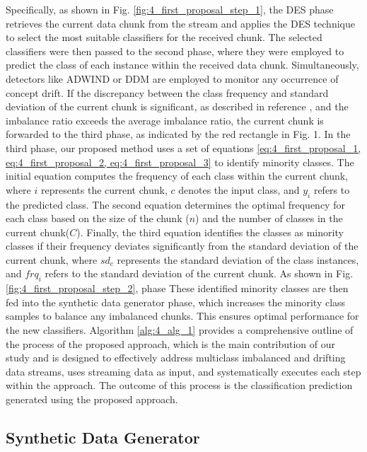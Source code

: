 Specifically, as shown in Fig. \ref{fig:4_first_proposal_step_1}, the DES phase retrieves the current data chunk from the stream and applies the DES technique to select the most suitable classifiers for the received chunk. The selected classifiers were then passed to the second phase, where they were employed to predict the class of each instance within the received data chunk. Simultaneously, detectors like ADWIND or DDM are employed to monitor any occurrence of concept drift. If the discrepancy between the class frequency and standard deviation of the current chunk is significant, as described in reference \cite{gama2004learning}, and the imbalance ratio exceeds the average imbalance ratio, the current chunk is forwarded to the third phase, as indicated by the red rectangle in Fig. 1. In the third phase, our proposed method uses a set of equations 	\ref{eq:4_first_proposal_1, eq:4_first_proposal_2, eq:4_first_proposal_3}
to identify minority classes. The initial equation computes the frequency of each class within the current chunk, where $i$ represents the current chunk, $c$ denotes the input class, and $y_i$ refers to the predicted class. The second equation determines the optimal frequency for each class based on the size of the chunk ($n$) and the number of classes in the current chunk($C$). Finally, the third equation identifies the classes as minority classes if their frequency deviates significantly from the standard deviation of the current chunk, where $sd_c$ represents the standard deviation of the class instances, and $frq_i$ refers to the standard deviation of the current chunk.
As shown in Fig. \ref{fig:4_first_proposal_step_2}, phase These identified minority classes are then fed into the synthetic data generator phase, which increases the minority class samples to balance any imbalanced chunks. This ensures optimal performance for the new classifiers. Algorithm  \ref{alg:4_alg_1} provides a comprehensive outline of the process of the proposed approach, which is the main contribution of our study and is designed to effectively address multiclass imbalanced and drifting data streams, uses streaming data as input, and systematically executes each step within the approach. The outcome of this process is the classification prediction generated using the proposed approach.


\subsection{Synthetic Data Generator}

